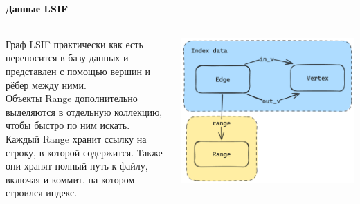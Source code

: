 \documentclass[aspectratio=169,professionalfonts,10pt]{beamer}
\begin{document}
\begin{frame}{\insertsection}
\framesubtitle{Данные LSIF}

\begin{columns}
    \begin{column}{0.5\textwidth}
        Граф LSIF практически как есть переносится в базу данных и представлен с помощью вершин и рёбер между ними.\\[\baselineskip]
        
        Объекты Range дополнительно выделяются в отдельную коллекцию, чтобы быстро по ним искать.\\[\baselineskip]
        
        Каждый Range хранит ссылку на строку, в которой содержится. Также они хранят полный путь к файлу, включая и коммит, на котором строился индекс.
    \end{column}
    \begin{column}{0.5\textwidth}
        \includegraphics[width=\textwidth]{figures/model-lsif.png}
    \end{column}
\end{columns}

\end{frame}
\end{document}

